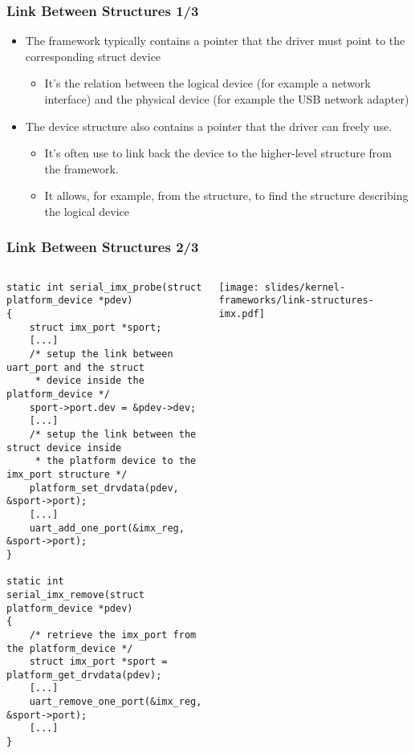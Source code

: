 \begin{frame}
  \frametitle{Link Between Structures 1/3}
  \begin{itemize}
  \item The framework typically contains a 
    pointer that the driver must point to the corresponding struct
    device
    \begin{itemize}
    \item It's the relation between the logical device (for example a
      network interface) and the physical device (for example the USB
      network adapter)
    \end{itemize}
  \item The device structure also contains a  pointer
    that the driver can freely use.
    \begin{itemize}
    \item It's often use to link back the device to the higher-level
      structure from the framework.
    \item It allows, for example, from the 
      structure, to find the structure describing the logical device
    \end{itemize}
  \end{itemize}
\end{frame}

\begin{frame}[fragile]
  \frametitle{Link Between Structures 2/3}
  \begin{columns}
    \begin{verbatim}
static int serial_imx_probe(struct platform_device *pdev)
{
    struct imx_port *sport;
    [...]
    /* setup the link between uart_port and the struct
     * device inside the platform_device */
    sport->port.dev = &pdev->dev;
    [...]
    /* setup the link between the struct device inside
     * the platform device to the imx_port structure */
    platform_set_drvdata(pdev, &sport->port);
    [...]
    uart_add_one_port(&imx_reg, &sport->port);
}

static int serial_imx_remove(struct platform_device *pdev)
{
    /* retrieve the imx_port from the platform_device */
    struct imx_port *sport = platform_get_drvdata(pdev);
    [...]
    uart_remove_one_port(&imx_reg, &sport->port);
    [...]
}
    \end{verbatim}
    \begin{center}
      \texttt{[image: slides/kernel-frameworks/link-structures-imx.pdf]}
    \end{center}
  \end{columns}
\end{frame}

